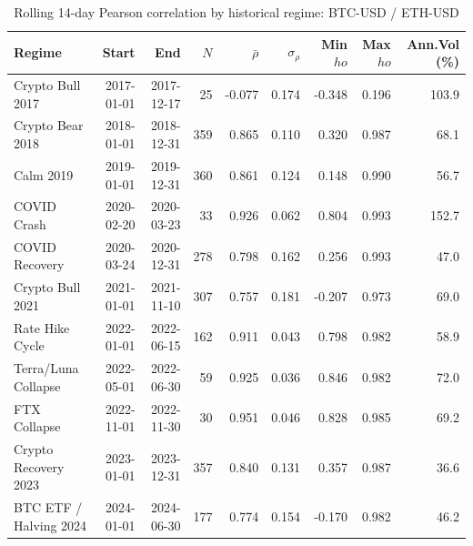 \begin{table}[H]
\centering
\small
\caption{Rolling 14-day Pearson correlation by historical regime: BTC-USD / ETH-USD}
\label{tab:regime_corr_BTCUSDETHUSD}
\begin{tabular}{lrrrrrrrr}
\toprule
Regime & Start & End & $N$ & $\bar{\rho}$ & $\sigma_\rho$ & Min $
ho$ & Max $
ho$ & Ann.Vol (\%) \\
\midrule
Crypto Bull 2017 & 2017-01-01 & 2017-12-17 & 25 & -0.077 & 0.174 & -0.348 & 0.196 & 103.9 \\
Crypto Bear 2018 & 2018-01-01 & 2018-12-31 & 359 & 0.865 & 0.110 & 0.320 & 0.987 & 68.1 \\
Calm 2019 & 2019-01-01 & 2019-12-31 & 360 & 0.861 & 0.124 & 0.148 & 0.990 & 56.7 \\
COVID Crash & 2020-02-20 & 2020-03-23 & 33 & 0.926 & 0.062 & 0.804 & 0.993 & 152.7 \\
COVID Recovery & 2020-03-24 & 2020-12-31 & 278 & 0.798 & 0.162 & 0.256 & 0.993 & 47.0 \\
Crypto Bull 2021 & 2021-01-01 & 2021-11-10 & 307 & 0.757 & 0.181 & -0.207 & 0.973 & 69.0 \\
Rate Hike Cycle & 2022-01-01 & 2022-06-15 & 162 & 0.911 & 0.043 & 0.798 & 0.982 & 58.9 \\
Terra/Luna Collapse & 2022-05-01 & 2022-06-30 & 59 & 0.925 & 0.036 & 0.846 & 0.982 & 72.0 \\
FTX Collapse & 2022-11-01 & 2022-11-30 & 30 & 0.951 & 0.046 & 0.828 & 0.985 & 69.2 \\
Crypto Recovery 2023 & 2023-01-01 & 2023-12-31 & 357 & 0.840 & 0.131 & 0.357 & 0.987 & 36.6 \\
BTC ETF / Halving 2024 & 2024-01-01 & 2024-06-30 & 177 & 0.774 & 0.154 & -0.170 & 0.982 & 46.2 \\
\bottomrule
\end{tabular}
\end{table}